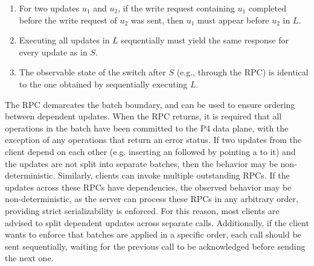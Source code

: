 \documentclass[11pt]{article}
\begin{document}
{\begin{enumerate}[noitemsep,topsep=\mdcompacttopsep]
\item{}For two updates $u_1$ and $u_2$, if the write request containing $u_1$
completed before the write request of $u_2$ was sent, then $u_1$ must appear
before $u_2$ in $L$.%

\item{}Executing all updates in $L$ sequentially must yield the same response for
every update as in $S$.%

\item{}The observable state of the switch after $S$ (e.g., through the  RPC)
is identical to the one obtained by sequentially executing $L$.%
\end{enumerate}%

\noindent{}The  RPC demarcates the batch boundary, and can be used to ensure
ordering between dependent updates. When the  RPC returns, it is required
that all operations in the batch have been committed to the P4 data plane, with
the exception of any operations that return an error status.  If two updates
from the client depend on each other (e.g. inserting an 
followed by pointing a  to it) and the updates are not split into
separate batches, then the behavior may be non-deterministic.  Similarly,
clients can invoke multiple outstanding  RPCs. If the updates across
these RPCs have dependencies, the observed behavior may be non-deterministic, as
the server can process these RPCs in any arbitrary order, providing strict
serializability is enforced. For this reason, most clients are advised to split
dependent updates across separate  calls. Additionally, if the client
wants to enforce that batches are applied in a specific order, each  call
should be sent sequentially, waiting for the previous call to be acknowledged
before sending the next one.%

}
\end{document}
